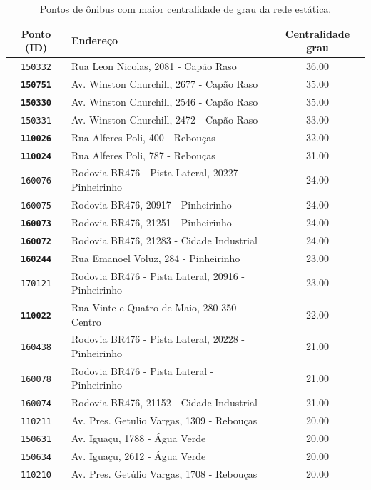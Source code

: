 \begin{table}[htb]
    \caption{Pontos de ônibus com maior centralidade de grau da rede estática.}
    \label{tab:centralidade-grau-rede-estatica}
    \centering
    \footnotesize
    \begin{tabular}{clc} 
        \hline
        Ponto (ID) & Endereço & Centralidade grau \\
        \hline
       \texttt{150332} &                 Rua Leon Nicolas, 2081 - Capão Raso &  36.00 \\
       \textbf{\texttt{150751}} &            Av. Winston Churchill, 2677 - Capão Raso &  35.00 \\
       \textbf{\texttt{150330}} &            Av. Winston Churchill, 2546 - Capão Raso &  35.00 \\
       \texttt{150331} &            Av. Winston Churchill, 2472 - Capão Raso &  33.00 \\
       \textbf{\texttt{110026}} &                    Rua Alferes Poli, 400 - Rebouças &  32.00 \\
       \textbf{\texttt{110024}} &                    Rua Alferes Poli, 787 - Rebouças &  31.00 \\
       \texttt{160076} &  Rodovia BR476 - Pista Lateral, 20227 - Pinheirinho &  24.00 \\
       \texttt{160075} &                  Rodovia BR476, 20917 - Pinheirinho &  24.00 \\
       \textbf{\texttt{160073}} &                  Rodovia BR476, 21251 - Pinheirinho &  24.00 \\
       \textbf{\texttt{160072}} &            Rodovia BR476, 21283 - Cidade Industrial &  24.00 \\
       \textbf{\texttt{160244}} &                Rua Emanoel Voluz, 284 - Pinheirinho &  23.00 \\
       \texttt{170121} &  Rodovia BR476 - Pista Lateral, 20916 - Pinheirinho &  23.00 \\
       \textbf{\texttt{110022}} &        Rua Vinte e Quatro de Maio, 280-350 - Centro &  22.00 \\
       \texttt{160438} &  Rodovia BR476 - Pista Lateral, 20228 - Pinheirinho &  21.00 \\
       \texttt{160078} &         Rodovia BR476 - Pista Lateral - Pinheirinho &  21.00 \\
       \texttt{160074} &            Rodovia BR476, 21152 - Cidade Industrial &  21.00 \\
       \texttt{110211} &           Av. Pres. Getulio Vargas, 1309 - Rebouças &  20.00 \\
       \texttt{150631} &                       Av. Iguaçu, 1788 - Água Verde &  20.00 \\
       \texttt{150634} &                       Av. Iguaçu, 2612 - Água Verde &  20.00 \\
       \texttt{110210} &           Av. Pres. Getúlio Vargas, 1708 - Rebouças &  20.00 \\
        
        \hline  
    \end{tabular}
\end{table}


